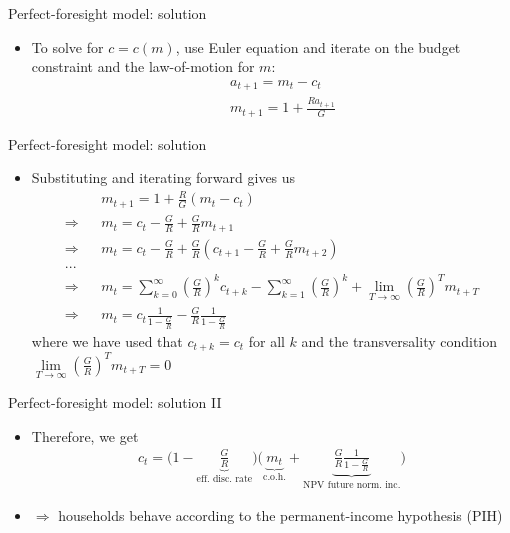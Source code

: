\documentclass[9pt]{beamer}
\newcommand{\bit}{\begin{itemize}}
\newcommand{\eit}{\end{itemize}}
\begin{document}
\begin{frame}{Perfect-foresight model: solution}

\bit
\setlength\itemsep{1.5em}

\item To solve for $c=c(m)$, use Euler equation and iterate on the budget constraint and the law-of-motion for $m$:
\begin{eqnarray}
&& a_{t+1} = m_t - c_t \nonumber \\
&& m_{t+1} = 1 + \frac{Ra_{t+1}}{G} \nonumber 
\end{eqnarray}

\eit

\end{frame}

\begin{frame}{Perfect-foresight model: solution}

\bit
\setlength\itemsep{1em}

\item Substituting and iterating forward gives us
\begin{eqnarray}
&& m_{t+1} = 1 + \frac{R}{G}(m_t-c_t) \nonumber \\
\Rightarrow &&  m_t = c_t - \frac{G}{R} + \frac{G}{R}m_{t+1}	\nonumber \\
\Rightarrow &&  m_t = c_t - \frac{G}{R} + \frac{G}{R}\left(c_{t+1} - \frac{G}{R} + \frac{G}{R}m_{t+2} \right)	\nonumber \\
...&& 	\nonumber \\
\Rightarrow &&  m_t = \sum_{k=0}^{\infty} \left(\frac{G}{R}\right)^k c_{t+k} - \sum_{k=1}^{\infty} \left(\frac{G}{R}\right)^k  + \lim\limits_{T \to \infty} \left(\frac{G}{R}\right)^T m_{t+T} \nonumber \\
\Rightarrow &&  m_t = c_t \frac{1}{1-\frac{G}{R}} - \frac{G}{R} \frac{1}{1-\frac{G}{R}} \nonumber
\end{eqnarray}
where we have used that $c_{t+k}=c_t$ for all $k$ and the transversality condition $\lim\limits_{T \to \infty} \left(\frac{G}{R}\right)^T m_{t+T}=0$


\eit
\end{frame}


\begin{frame}{Perfect-foresight model: solution II}

\bit
\setlength\itemsep{1.5em}

\item Therefore, we get
\begin{align*}
c_t = \Bigg(1-\underbrace{\frac{G}{R}}_{\text{eff. disc. rate}}\Bigg)\Bigg(\underbrace{m_t}_{\text{c.o.h.}} + \underbrace{\frac{G}{R} \frac{1}{1-\frac{G}{R}}}_{\text{NPV future norm. inc.}} \Bigg) \nonumber
\end{align*}

\item $\Rightarrow$ households behave according to the permanent-income hypothesis (PIH)
\eit
\end{frame}
\end{document}
